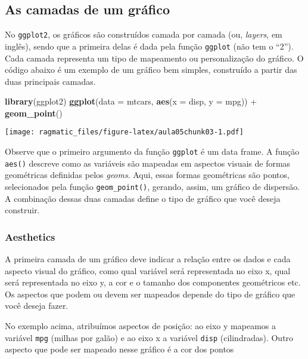 \documentclass[]{book}
\newenvironment{Shaded}{\begin{snugshade}}{\end{snugshade}}
\newcommand{\KeywordTok}[1]{\textcolor[rgb]{0.13,0.29,0.53}{\textbf{{#1}}}}
\newcommand{\DataTypeTok}[1]{\textcolor[rgb]{0.13,0.29,0.53}{{#1}}}
\newcommand{\StringTok}[1]{\textcolor[rgb]{0.31,0.60,0.02}{{#1}}}
\newcommand{\NormalTok}[1]{{#1}}
\begin{document}
\subsection{As camadas de um gráfico}\label{as-camadas-de-um-grafico}

No \texttt{ggplot2}, os gráficos são construídos camada por camada (ou,
\emph{layers}, em inglês), sendo que a primeira delas é dada pela função
\texttt{ggplot} (não tem o ``2''). Cada camada representa um tipo de
mapeamento ou personalização do gráfico. O código abaixo é um exemplo de
um gráfico bem simples, construído a partir das duas principais camadas.

\begin{Shaded}
\begin{Highlighting}[]
\KeywordTok{library}\NormalTok{(ggplot2)}
\KeywordTok{ggplot}\NormalTok{(}\DataTypeTok{data =} \NormalTok{mtcars, }\KeywordTok{aes}\NormalTok{(}\DataTypeTok{x =} \NormalTok{disp, }\DataTypeTok{y =} \NormalTok{mpg)) +}\StringTok{ }
\StringTok{  }\KeywordTok{geom_point}\NormalTok{()}
\end{Highlighting}
\end{Shaded}

\texttt{[image: ragmatic\_files/figure-latex/aula05chunk03-1.pdf]}

Observe que o primeiro argumento da função \texttt{ggplot} é um data
frame. A função \texttt{aes()} descreve como as variáveis são mapeadas
em aspectos visuais de formas geométricas definidas pelos \emph{geoms}.
Aqui, essas formas geométricas são pontos, selecionados pela função
\texttt{geom\_point()}, gerando, assim, um gráfico de dispersão. A
combinação dessas duas camadas define o tipo de gráfico que você deseja
construir.

\subsubsection{Aesthetics}\label{aesthetics}

A primeira camada de um gráfico deve indicar a relação entre os dados e
cada aspecto visual do gráfico, como qual variável será representada no
eixo x, qual será representada no eixo y, a cor e o tamanho dos
componentes geométricos etc. Os aspectos que podem ou devem ser mapeados
depende do tipo de gráfico que você deseja fazer.

No exemplo acima, atribuímos aspectos de posição: ao eixo y mapeamos a
variável \texttt{mpg} (milhas por galão) e ao eixo x a variável
\texttt{disp} (cilindradas). Outro aspecto que pode ser mapeado nesse
gráfico é a cor dos pontos
\end{document}
